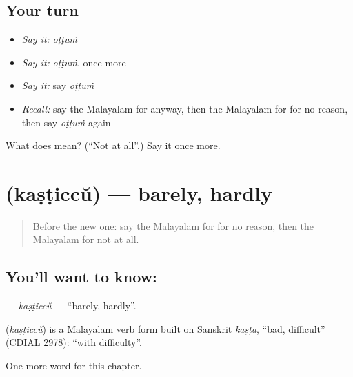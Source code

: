 \subsection*{Your turn}
\begin{itemize}
\raggedright
  \item \emph{Say it:} \emph{oṭṭuṁ}
  \item \emph{Say it:} \emph{oṭṭuṁ}, once more
  \item \emph{Say it:} say \emph{oṭṭuṁ}
  \item \emph{Recall:} say the Malayalam for anyway, then the Malayalam for for no reason, then say \emph{oṭṭuṁ} again
\end{itemize}

\begin{tcolorbox}[breakable,colback=teal!4,colframe=teal!35!black,title={Before you move on}]
What does  mean? (\textquotedblleft{}Not at all\textquotedblright{}.) Say it once more.
\end{tcolorbox}
\section[\texorpdfstring{\ml{കഷ്ടിച്ച്} (kaṣṭiccŭ)}{കഷ്ടിച്ച് (kaṣṭiccŭ)}]{ (kaṣṭiccŭ) — barely, hardly}

\label{lesson:ML-C317-kasticcu}



\begin{quote}
Before the new one: say the Malayalam for for no reason, then the Malayalam for not at all.
\end{quote}

\subsection*{You'll want to know: }
\textbf{} — \emph{kaṣṭiccŭ} — \textquotedblleft{}barely, hardly\textquotedblright{}.

\begin{cousinweb}
\textbf{} (\emph{kaṣṭiccŭ}) is a Malayalam verb form built on Sanskrit \emph{kaṣṭa}, \textquotedblleft{}bad, difficult\textquotedblright{} (CDIAL 2978): \textquotedblleft{}with difficulty\textquotedblright{}.
\end{cousinweb}

\begin{grammarlens}[title={What you've built}]
One more word for this chapter.
\end{grammarlens}

